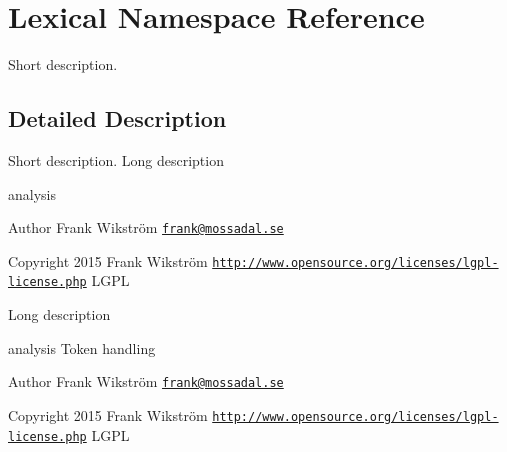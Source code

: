 \hypertarget{namespaceLexical}{\section{Lexical Namespace Reference}
\label{namespaceLexical}
}


Short description.  




\subsection{Detailed Description}
Short description. Long description

analysis \begin{DoxyAuthor}{Author}
Frank Wikström \href{mailto:frank@mossadal.se}{\tt frank@mossadal.\-se} 
\end{DoxyAuthor}
\begin{DoxyCopyright}{Copyright}
2015 Frank Wikström  \href{http://www.opensource.org/licenses/lgpl-license.php}{\tt http\-://www.\-opensource.\-org/licenses/lgpl-\/license.\-php} L\-G\-P\-L
\end{DoxyCopyright}
Long description

analysis  Token handling \begin{DoxyAuthor}{Author}
Frank Wikström \href{mailto:frank@mossadal.se}{\tt frank@mossadal.\-se} 
\end{DoxyAuthor}
\begin{DoxyCopyright}{Copyright}
2015 Frank Wikström  \href{http://www.opensource.org/licenses/lgpl-license.php}{\tt http\-://www.\-opensource.\-org/licenses/lgpl-\/license.\-php} L\-G\-P\-L 
\end{DoxyCopyright}
